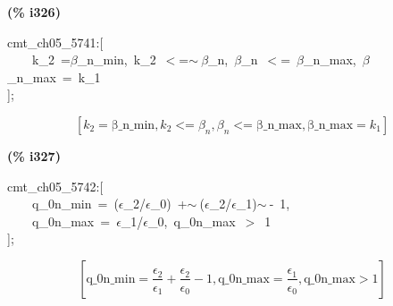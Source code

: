 \documentclass[fleqn]{article}
\begin{document}
\noindent
\begin{minipage}[t]{4.000000em}\color{red}\bfseries
(\% i326)	
\end{minipage}
\begin{minipage}[t]{\textwidth}\color{blue}
cmt\_ch05\_5741:[\\
\ \ \ \ k\_2\ =\ensuremath{\beta}\_n\_min,\ k\_2\ \ensuremath{<}=\ensuremath{\sim\ }\ensuremath{\beta}\_n,\ \ensuremath{\beta}\_n\ \ensuremath{<}=\ \ensuremath{\beta}\_n\_max,\ \ensuremath{\beta}\_n\_max\ =\ k\_1\\
];
\end{minipage}
\[\displaystyle \tag{\% o326} 
\left[ {k_2}=\ensuremath{\mathrm{\beta \_ n\_ min}}\operatorname{,}{k_2}\operatorname{<  =}{{\beta }_n}\operatorname{,}{{\beta }_n}\operatorname{<  =}\ensuremath{\mathrm{\beta \_ n\_ max}}\operatorname{,}\ensuremath{\mathrm{\beta \_ n\_ max}}={k_1}\right] \mbox{}
\]


\noindent
\begin{minipage}[t]{4.000000em}\color{red}\bfseries
(\% i327)	
\end{minipage}
\begin{minipage}[t]{\textwidth}\color{blue}
cmt\_ch05\_5742:[\\
\ \ \ \ q\_0n\_min\ =\ (\ensuremath{\epsilon}\_2/\ensuremath{\epsilon}\_0)\ +\ensuremath{\sim\ }(\ensuremath{\epsilon}\_2/\ensuremath{\epsilon}\_1)\ensuremath{\sim\ }-\ 1,\\
\ \ \ \ q\_0n\_max\ =\ \ensuremath{\epsilon}\_1/\ensuremath{\epsilon}\_0,\ q\_0n\_max\ \ensuremath{>}\ 1\\
];
\end{minipage}
\[\displaystyle \tag{\% o327} 
\left[ \ensuremath{\mathrm{q\_ 0n\_ min}}=\frac{{{\epsilon }_2}}{{{\epsilon }_1}}+\frac{{{\epsilon }_2}}{{{\epsilon }_0}}-1\operatorname{,}\ensuremath{\mathrm{q\_ 0n\_ max}}=\frac{{{\epsilon }_1}}{{{\epsilon }_0}}\operatorname{,}\ensuremath{\mathrm{q\_ 0n\_ max}}\operatorname{>  }1\right] \mbox{}
\]
\end{document}
